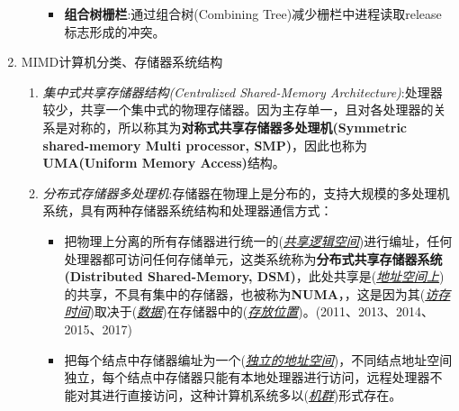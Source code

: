 \documentclass[a4paper]{ctexart}
\newcommand{\blank}[1]{(\emph{\underline{#1}})}
\begin{document}
\begin{enumerate}
\begin{enumerate}
\begin{itemize}
      \item \textbf{组合树栅栏}:通过组合树(Combining Tree)减少栅栏中进程读取release标志形成的冲突。
    \end{itemize}
  \end{enumerate}
  \item MIMD计算机分类、存储器系统结构
  \begin{enumerate}
    \item \emph{集中式共享存储器结构(Centralized Shared-Memory Architecture)}:处理器较少，共享一个集中式的物理存储器。因为主存单一，且对各处理器的关系是对称的，所以称其为\textbf{对称式共享存储器多处理机(Symmetric shared-memory Multi processor, SMP)}，因此也称为\textbf{UMA(Uniform Memory Access)}结构。
    \item \emph{分布式存储器多处理机}:存储器在物理上是分布的，支持大规模的多处理机系统，具有两种存储器系统结构和处理器通信方式：
    \begin{itemize}
      \item 把物理上分离的所有存储器进行统一的\blank{共享逻辑空间}进行编址，任何处理器都可访问任何存储单元，这类系统称为\textbf{分布式共享存储器系统(Distributed Shared-Memory, DSM)}，此处共享是\blank{地址空间上}的共享，不具有集中的存储器，也被称为\textbf{NUMA}，，这是因为其\blank{访存时间}取决于\blank{数据}在存储器中的\blank{存放位置}。(2011、2013、2014、2015、2017)
      \item 把每个结点中存储器编址为一个\blank{独立的地址空间}，不同结点地址空间独立，每个结点中存储器只能有本地处理器进行访问，远程处理器不能对其进行直接访问，这种计算机系统多以\blank{机群}形式存在。
    \end{itemize}
  \end{enumerate}
\end{enumerate}
\end{document}
